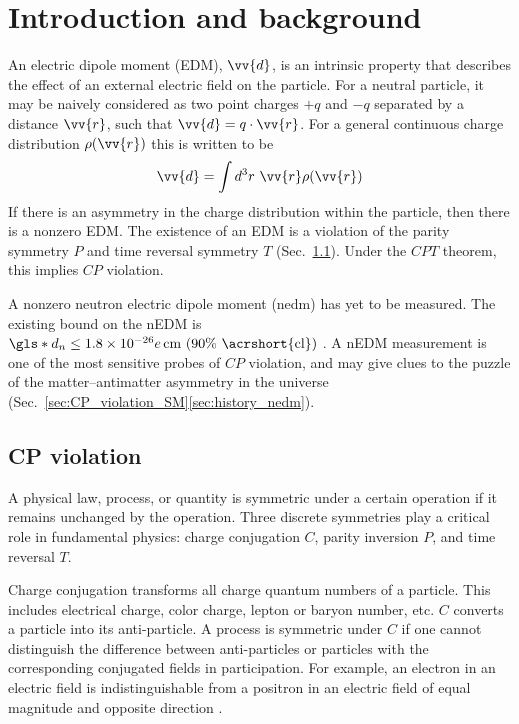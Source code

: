 
\chapter{Introduction and background}


An electric dipole moment (EDM), $\vv{d}$, is an intrinsic property that describes the effect of an external electric field on the particle. For a neutral particle, it may be naively considered as two point charges $+q$ and $-q$ separated by a distance $\vv{r}$, such that $\vv{d}=q\cdot \vv{r}$. For a general continuous charge distribution $\rho(\vv{r})$ this is written to be
%
\begin{gather}
    \vv{d}=\int d^3r\,\,\vv{r}\rho(\vv{r})
\end{gather}
%
If there is an asymmetry in the charge distribution within the particle, then there is a nonzero EDM. The existence of an EDM is a violation of the parity symmetry $P$ and time reversal symmetry $T$ (Sec.~\ref{sec:CP_violation}). Under the $CPT$ theorem, this implies $CP$ violation.

A nonzero neutron electric dipole moment (\acrshort*{nedm}) has yet to be measured. The existing bound on the nEDM is $\gls*{d_n}\leq 1.8\times10^{-26}e\,\text{cm (90\% \acrshort{cl})}$ \cite{pdg2022}. A nEDM measurement is one of the most sensitive probes of $CP$ violation, and may give clues to the puzzle of the matter–antimatter asymmetry in the universe (Sec.~\ref{sec:CP_violation_SM}\textendash\ref{sec:history_nedm}).


\section{CP violation}\label{sec:CP_violation}


A physical law, process, or quantity is symmetric under a certain operation if it remains unchanged by the operation. Three discrete symmetries play a critical role in fundamental physics: charge conjugation $C$, parity inversion $P$, and time reversal $T$.

Charge conjugation transforms all charge quantum numbers of a particle. This includes electrical charge, color charge, lepton or baryon number, etc. $C$ converts a particle into its anti-particle. A process is symmetric under $C$ if one cannot distinguish the difference between anti-particles or particles with the corresponding conjugated fields in participation. For example, an electron in an electric field is indistinguishable from a positron in an electric field of equal magnitude and opposite direction \cite{schmidt-wellenburg_quest_2017}.

